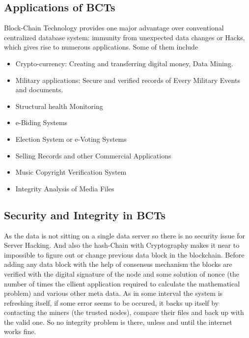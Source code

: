 \subsection{Applications of BCTs}
Block-Chain Technology provides one major advantage over conventional centralized database system: immunity from unexpected data changes or Hacks, which gives rise to numerous applications. Some of them include

\begin{itemize}
\item Crypto-currency: Creating and transferring digital money, Data Mining.
\item Military applications: Secure and verified records of Every Military Events and documents.
\item Structural health Monitoring
\item e-Biding Systems
\item Election System or e-Voting Systems
\item Selling Records and other Commercial Applications
\item Music Copyright Verification System
\item Integrity Analysis of Media Files
\end{itemize}

\subsection{Security and Integrity in BCTs}
As the data is not sitting on a single data server so there is no security issue for Server Hacking. And also the hash-Chain with Cryptography makes it near to impossible to figure out or change previous data block in the blockchain. Before adding any data block with the help of consensus mechanism the blocks are verified with the digital signature of the node and some solution of nonce (the number of times the cllient application required to calculate the mathematical problem) and various other meta data.
As in some interval the system is refreshing itself, if some error seems to be occured, it backs up itself by contacting the miners (the trusted nodes), compare their files and back up with the valid one. So no integrity problem is there, unless and until the internet works fine.
